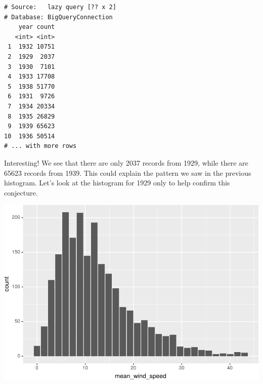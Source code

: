 \documentclass[]{krantz}
\makeatletter
\newenvironment{Shaded}{\begin{snugshade}}{\end{snugshade}}
\newcommand{\DataTypeTok}[1]{\textcolor[rgb]{0.27,0.27,0.27}{#1}}
\newcommand{\DecValTok}[1]{\textcolor[rgb]{0.06,0.06,0.06}{#1}}
\newcommand{\KeywordTok}[1]{\textcolor[rgb]{0.27,0.27,0.27}{\textbf{#1}}}
\newcommand{\NormalTok}[1]{#1}
\newcommand{\OperatorTok}[1]{\textcolor[rgb]{0.43,0.43,0.43}{\textbf{#1}}}
\newcommand{\StringTok}[1]{\textcolor[rgb]{0.5,0.5,0.5}{#1}}
\newenvironment{kframe}{%
\medskip{}
\setlength{\fboxsep}{.8em}
 \def\at@end@of@kframe{}%
 \ifinner\ifhmode%
  \def\at@end@of@kframe{\end{minipage}}%
  \begin{minipage}{\columnwidth}%
 \fi\fi%
 \def\FrameCommand##1{\hskip\@totalleftmargin \hskip-\fboxsep
 \colorbox{shadecolor}{##1}\hskip-\fboxsep
     \hskip-\linewidth \hskip-\@totalleftmargin \hskip\columnwidth}%
 \MakeFramed {\advance\hsize-\width
   \@totalleftmargin\z@ \linewidth\hsize
   \@setminipage}}%
 {\par\unskip\endMakeFramed%
 \at@end@of@kframe}
\renewenvironment{Shaded}{\begin{kframe}}{\end{kframe}}
\makeatother
\begin{document}
\begin{Shaded}
\end{Shaded}

\begin{verbatim}
# Source:   lazy query [?? x 2]
# Database: BigQueryConnection
    year count
   <int> <int>
 1  1932 10751
 2  1929  2037
 3  1930  7101
 4  1933 17708
 5  1938 51770
 6  1931  9726
 7  1934 20334
 8  1935 26829
 9  1939 65623
10  1936 50514
# ... with more rows
\end{verbatim}

Interesting! We see that there are only 2037 records from 1929, while there are 65623 records from 1939. This could explain the pattern we saw in the previous histogram. Let's look at the histogram for 1929 only to help confirm this conjecture.

\begin{Shaded}
\end{Shaded}

\includegraphics{bookdown_files/figure-latex/unnamed-chunk-307-1.pdf}
\end{document}

